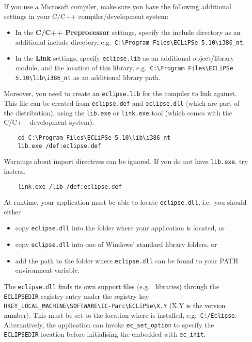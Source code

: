 If you use a Microsoft compiler, make sure you have the following
additional settings in your C/C++ compiler/development system:
\begin{itemize}
\item In the {\bf C/C++ Preprocessor} settings,
specify the {\eclipse} include directory as an additional
include directory, e.g.\ \verb+C:\Program Files\ECLiPSe 5.10\i386_nt+.
\item In the {\bf Link} settings,
specify \verb+eclipse.lib+ as an additional object/library
module, and the location of this library, e.g.\
\verb+C:\Program Files\ECLiPSe 5.10\lib\i386_nt+ as an additional library path.
\end{itemize}
Moreover, you need to create an \verb+eclipse.lib+ for the compiler to
link against.  This file can be created from \verb+eclipse.def+ and
\verb+eclipse.dll+ (which are part of the {\eclipse} distribution),
using the \verb+lib.exe+ or \verb+link.exe+ tool (which comes with the
C/C++ development system).
\begin{verbatim}
    cd C:\Program Files\ECLiPSe 5.10\lib\i386_nt
    lib.exe /def:eclipse.def
\end{verbatim}
Warnings about import directives can be ignored.
If you do not have \verb+lib.exe+, try instead
\begin{verbatim}
    link.exe /lib /def:eclipse.def
\end{verbatim}

At runtime, your application must be able to locate \verb+eclipse.dll+,
\index{eclipse.dll}
i.e.\ you should either
\begin{itemize}
\item copy \verb+eclipse.dll+ into the folder where your application is located, or
\item copy \verb+eclipse.dll+ into one of Windows' standard library folders, or
\item add the path to the folder where \verb+eclipse.dll+ can be found
	to your PATH environment variable.
\end{itemize}
The \verb+eclipse.dll+ finds its own support files (e.g.\ {\eclipse} libraries)
through the \verb+ECLIPSEDIR+ registry entry under the registry key
\verb+HKEY_LOCAL_MACHINE\SOFTWARE\IC-Parc\ECLiPSe\X.Y+ (X.Y is the version
number).
This must be set to the location where {\eclipse} is installed,
e.g.\ \verb+C:/Eclipse+.
Alternatively, the application can invoke \verb+ec_set_option+ to specify
the \verb+ECLIPSEDIR+ location before initialising the embedded {\eclipse}
with \verb+ec_init+.


